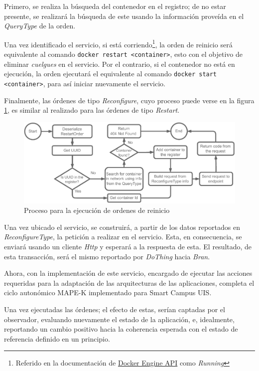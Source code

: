 Primero, se realiza la búsqueda del contenedor en el registro; de no estar presente, se realizará la búsqueda de este usando la información proveída en el \textit{QueryType} de la orden.

Una vez identificado el servicio, si está corriendo\footnote{Referido en la documentación de \href{https://docs.docker.com/engine/api/v1.43/\#tag/Container/operation/ContainerInspect}{Docker Engine API} como \textit{Running}}, la orden de reinicio será equivalente al comando \texttt{docker restart <container>}, esto con el objetivo de eliminar \textit{cuelgues} en el servicio. Por el contrario, si el contenedor no está en ejecución, la orden ejecutará el equivalente al comando \texttt{docker start <container>}, para así iniciar nuevamente el servicio.

Finalmente, las órdenes de tipo \textit{Reconfigure}, cuyo proceso puede verse en la figura \ref{fig:DoThingReconfig}, es similar al realizado para las órdenes de tipo \textit{Restart}. 

\begin{figure}[ht]
    \centering
    \caption{Proceso para la ejecución de ordenes de reinicio}
    \label{fig:DoThingReconfig}
    \includegraphics[width=0.8\linewidth]{images/DoThingReconfig.pdf}
\end{figure}

Una vez ubicado el servicio, se construirá, a partir de los datos reportados en \textit{ReconfigureType}, la petición a realizar en el servicio. Esta, en consecuencia, se enviará usando un cliente \textit{Http} y esperará a la respuesta de esta. El resultado, de esta transacción, será el mismo reportado por \textit{DoThing} hacia \textit{Bran}.

Ahora, con la implementación de este servicio, encargado de ejecutar las acciones requeridas para la adaptación de las arquitecturas de las aplicaciones, completa el ciclo autonómico MAPE-K implementado para Smart Campus UIS. 

Una vez ejecutadas las órdenes; el efecto de estas, serían captadas por el observador, evaluando nuevamente el estado de la aplicación, e, idealmente, reportando un cambio positivo hacia la coherencia esperada con el estado de referencia definido en un principio.

